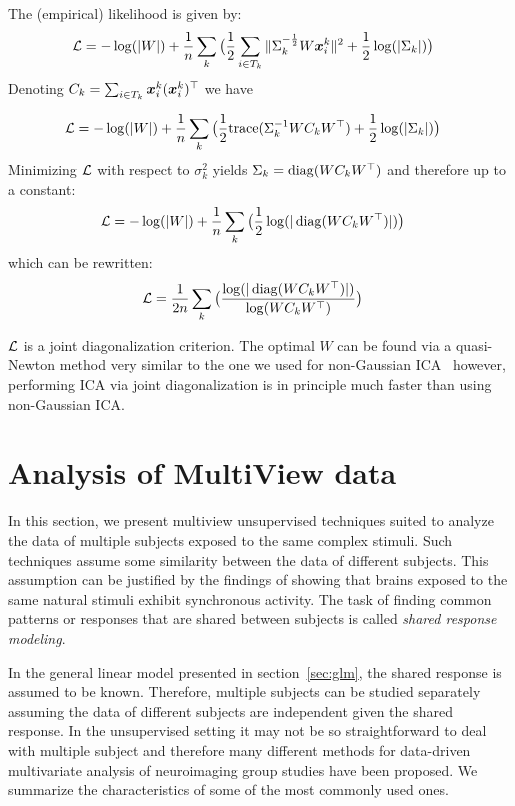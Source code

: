 The (empirical) likelihood is given by:
\begin{align}  
  \mathcal{L} &= -\log(|W|)  + \frac1{n} \sum_k \big( \frac12 \sum_{i \in T_k}\|\Sigma_k^{-\frac12} W \boldsymbol{x}^k_i \|^2 + \frac12 \log(|\Sigma_k|) \big)
\end{align}
Denoting $C_k = \sum_{i \in T_k} \boldsymbol{x}_i^k (\boldsymbol{x}_i^k)^{\top}$ we have 

\begin{align}  
  \mathcal{L} &= -\log(|W|)  + \frac1{n} \sum_k \big( \frac1{2} {\mathrm{ trace}}(\Sigma_k^{-1} W C_k W^{\top}) + \frac12 \log(|\Sigma_k|) \big)
\end{align}
Minimizing $\mathcal{L}$ with respect to $\sigma_k^2$ yields $\Sigma_k = \operatorname*{diag}(W C_k
W^{\top})$ and therefore up to a constant:
\begin{align}  
  \mathcal{L} &= -\log(|W|)  + \frac1{n} \sum_k \big(\frac12 \log(|\operatorname*{diag}(W C_k W^{\top})|) \big)
\end{align}
which can be rewritten:
\begin{align}  
  \mathcal{L} &=\frac1{2n} \sum_k \big(\frac{\log(|\operatorname*{diag}(W C_k W^{\top})|)}{\log(W C_k W^{\top})} \big)
\end{align}

$\mathcal{L}$ is a joint diagonalization criterion. The optimal $W$ can be found via a
quasi-Newton method very similar to the one we used for non-Gaussian
ICA~\cite{ablin2018beyond} however, performing ICA via joint diagonalization is
in principle much faster than using non-Gaussian ICA.

\section{Analysis of MultiView data}
In this section, we present multiview unsupervised techniques suited to
analyze the data of multiple subjects exposed to the same complex stimuli. Such
techniques assume some similarity between the data of different subjects. This
assumption can be justified by the findings of \cite{hasson2004intersubject} showing that brains exposed to the same natural stimuli exhibit synchronous activity.
The task of finding common patterns or responses that are shared between
subjects is called \emph{shared response modeling}.

In the general linear model presented in
section~\ref{sec:glm}, the shared response is assumed to be known. Therefore,
multiple subjects can be studied separately assuming the data of different
subjects are independent given the shared response.
In the unsupervised setting it may not be so straightforward to deal with
multiple subject and therefore many different
methods for data-driven multivariate analysis of neuroimaging group studies
have been proposed.
We summarize the characteristics of some of the most commonly used ones.


